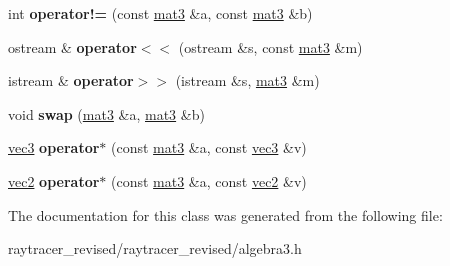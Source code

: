 \begin{DoxyCompactItemize}
\item 
\hypertarget{classmat3_a8716eb2c3905a861aefd96b32f36ded0}{
int {\bfseries operator!=} (const \hyperlink{classmat3}{mat3} \&a, const \hyperlink{classmat3}{mat3} \&b)}
\label{classmat3_a8716eb2c3905a861aefd96b32f36ded0}

\item 
\hypertarget{classmat3_a99f9d2972d1245f83f81217c8b186209}{
ostream \& {\bfseries operator$<$$<$} (ostream \&s, const \hyperlink{classmat3}{mat3} \&m)}
\label{classmat3_a99f9d2972d1245f83f81217c8b186209}

\item 
\hypertarget{classmat3_ac89acaef16a4074b5514a811848053f2}{
istream \& {\bfseries operator$>$$>$} (istream \&s, \hyperlink{classmat3}{mat3} \&m)}
\label{classmat3_ac89acaef16a4074b5514a811848053f2}

\item 
\hypertarget{classmat3_ac0ca53f4f00e55a17cccd57bd66b29c8}{
void {\bfseries swap} (\hyperlink{classmat3}{mat3} \&a, \hyperlink{classmat3}{mat3} \&b)}
\label{classmat3_ac0ca53f4f00e55a17cccd57bd66b29c8}

\item 
\hypertarget{classmat3_a46bbeb7eed270ad69b34c3a1b93eb050}{
\hyperlink{classvec3}{vec3} {\bfseries operator$\ast$} (const \hyperlink{classmat3}{mat3} \&a, const \hyperlink{classvec3}{vec3} \&v)}
\label{classmat3_a46bbeb7eed270ad69b34c3a1b93eb050}

\item 
\hypertarget{classmat3_a307ae299187b6d9e75b1a7730b6213c2}{
\hyperlink{classvec2}{vec2} {\bfseries operator$\ast$} (const \hyperlink{classmat3}{mat3} \&a, const \hyperlink{classvec2}{vec2} \&v)}
\label{classmat3_a307ae299187b6d9e75b1a7730b6213c2}

\end{DoxyCompactItemize}


The documentation for this class was generated from the following file:\begin{DoxyCompactItemize}
\item 
raytracer\_\-revised/raytracer\_\-revised/algebra3.h\end{DoxyCompactItemize}
